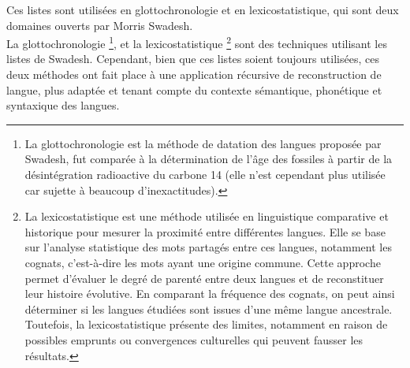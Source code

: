 \documentclass[12pt, french, twoside]{report}
\begin{document}
Ces listes sont utilisées en glottochronologie et en lexicostatistique, qui sont deux domaines ouverts par Morris Swadesh.\\
\indent La glottochronologie \footnote{La glottochronologie est la méthode de datation des langues proposée par Swadesh, fut comparée à la détermination de l'âge des fossiles à partir de la désintégration radioactive du carbone 14 (elle n'est cependant plus utilisée car sujette à beaucoup d'inexactitudes).}, et la lexicostatistique \footnote{ La lexicostatistique est une méthode utilisée en linguistique comparative et historique pour mesurer la proximité entre différentes langues. Elle se base sur l'analyse statistique des mots partagés entre ces langues, notamment les cognats, c'est-à-dire les mots ayant une origine commune. Cette approche permet d'évaluer le degré de parenté entre deux langues et de reconstituer leur histoire évolutive. En comparant la fréquence des cognats, on peut ainsi déterminer si les langues étudiées sont issues d'une même langue ancestrale. Toutefois, la lexicostatistique présente des limites, notamment en raison de possibles emprunts ou convergences culturelles qui peuvent fausser les résultats.} sont des techniques utilisant les listes de Swadesh. Cependant, bien que ces listes soient toujours utilisées,  ces deux méthodes ont fait place à une application récursive de reconstruction de langue, plus adaptée et tenant compte du contexte sémantique, phonétique et syntaxique des langues.\\ 
\end{document}
